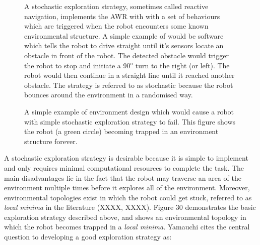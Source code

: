 \documentclass[a4paper]{article}
\begin{document}
\begin{figure}[h]
\begin{minipage}{0.45\textwidth}
A stochastic exploration strategy, sometimes called reactive navigation, implements the AWR with with a set of behaviours which are triggered when the robot encounters some known environmental structure. A simple example of would be software which tells the robot to drive straight until it's sensors locate an obstacle in front of the robot. The detected obstacle would trigger the robot to stop and initiate a 90$^o$ turn to the right (or left). The robot would then continue in a straight line until it reached another obstacle. The strategy is referred to as stochastic because the robot bounces around the environment in a randomised way.
\end{minipage}
\hspace{1cm}
\begin{minipage}{0.45\textwidth}
\centering
{}
\caption{A simple example of environment design which would cause a robot with simple stochastic exploration strategy to fail. This figure shows the robot (a green circle) becoming trapped in an environment structure forever.}
\end{minipage}
\end{figure}

A stochastic exploration strategy is desirable because it is simple to implement and only requires minimal computational resources to complete the task. The main disadvantages lie in the fact that the robot may traverse an area of the environment multiple times before it explores all of the environment. Moreover, environmental topologies exist in which the robot could get stuck, referred to as \textit{local minima} in the literature (XXXX, XXXX). Figure 30 demonstrates the basic exploration strategy described above, and shows an environmental topology in which the robot becomes trapped in a \textit{local minima}. Yamauchi cites the central question to developing a good exploration strategy as:
\end{document}
